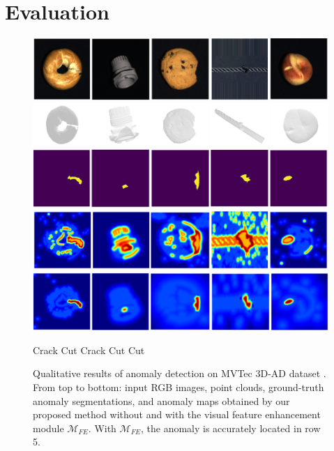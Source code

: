\section*{Evaluation}
\label{sec:evaluation}

\begin{figure}[ht]
\centering
\includegraphics[width=0.9\linewidth]{figs/result_rgb}
\includegraphics[width=0.9\linewidth]{figs/result_pc}
\includegraphics[width=0.9\linewidth]{figs/result_gt}
\includegraphics[width=0.9\linewidth]{figs/result_baseline}
\includegraphics[width=0.9\linewidth]{figs/result_ours}
\vspace{-0.2cm}

\begin{flushleft}
 \hspace{1.5cm} Crack \hspace{2.6cm} Cut  \hspace{2.6cm} Crack  \hspace{2.5cm} Cut  \hspace{2.3cm} Cut
 \end{flushleft}
 
 \vspace{-0.1cm}
\caption{Qualitative results of anomaly detection on MVTec 3D-AD dataset \cite{bergmann2022mvtec}. From top to bottom: input RGB images, point clouds, ground-truth anomaly segmentations, and anomaly maps obtained by our proposed method without and with the visual feature enhancement module $\mathcal{M}_{FE}$. With $\mathcal{M}_{FE}$, the anomaly is accurately located in row 5.}
\label{fig:results1}
\end{figure}

